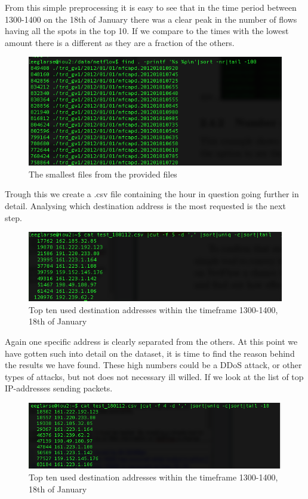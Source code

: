 From this simple preprocessing it is easy to see that in the time period between 1300-1400 on the 18th of January there was a clear peak in the number of flows having all the spots in the top 10. If we compare to the times with the lowest amount there is a different as they are a fraction of the others.

\begin{figure}
\includegraphics[scale=0.6]{bottom}
\caption{The smallest files from the provided files}
\end{figure}

Trough this we create a .csv file containing the hour in question going further in detail.
Analysing which destination address is the most requested is the next step. 

\begin{figure}
\includegraphics[scale=0.6]{ip_top_list}
\caption{Top ten used destination addresses within the timeframe 1300-1400, 18th of January}
\end{figure}

Again one specific address is clearly separated from the others. At this point we have gotten such into detail on the dataset, it is time to find the reason behind the results we have found. 
These high numbers could be a DDoS attack, or other types of attacks, but not does not necessary ill willed. If we look at the list of top IP-addresses sending packets.

\begin{figure}
\includegraphics[scale=0.6]{top10_sa}
\caption{Top ten used destination addresses within the timeframe 1300-1400, 18th of January}
\end{figure}

